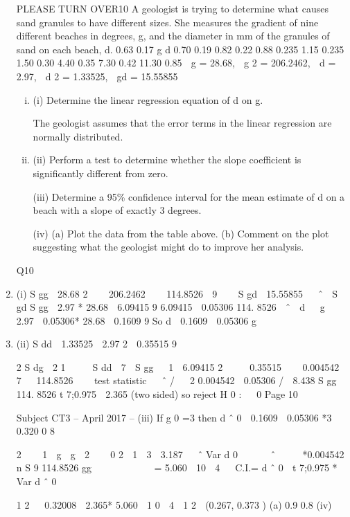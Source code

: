 \documentclass[a4paper,12pt]{article}
\begin{document}
\begin{enumerate}
PLEASE TURN OVER10
A geologist is trying to determine what causes sand granules to have different sizes.
She measures the gradient of nine different beaches in degrees, g, and the diameter in
mm of the granules of sand on each beach, d.
0.63
0.17
g
d
0.70
0.19
0.82
0.22
0.88
0.235
1.15
0.235
1.50
0.30
4.40
0.35
7.30
0.42
11.30
0.85
 g = 28.68,  g 2 = 206.2462,  d = 2.97,  d 2 = 1.33525,  gd = 15.55855
\begin{enumerate}[(i)]
\item (i)
Determine the linear regression equation of d on g.

The geologist assumes that the error terms in the linear regression are normally
distributed.
\item (ii)
Perform a test to determine whether the slope coefficient is significantly
different from zero.

(iii) Determine a 95\% confidence interval for the mean estimate of d on a beach
with a slope of exactly 3 degrees.

(iv) (a)
Plot the data from the table above.
(b)
Comment on the plot suggesting what the geologist might do to
improve her analysis.

\end{enumerate}

Q10
\item (i)
S gg

28.68 2 
  206.2462 
  114.8526

9  

S gd  15.55855 
 ˆ 
S gd
S gg

2.97 * 28.68
 6.09415
9
6.09415
 0.05306
114. 8526
 ˆ  d   g 
2.97  0.05306* 28.68
 0.1609
9
So d  0.1609  0.05306 g
\item (ii)
S dd  1.33525 
2.97 2
 0.35515
9





2
S dg
 2 1 
   S dd 
7 
S gg
  1 
6.09415 2 
   0.35515 
  0.004542
 7  
114.8526  
 
test statistic   ˆ / 
 2
0.004542
 0.05306 /
 8.438
S gg
114. 8526 
t 7;0.975  2.365 (two sided) so reject H 0 :   0
Page 10

Subject CT3  – April 2017 – %
(iii)
If g 0 =3 then d ˆ 0  0.1609  0.05306 *3  0.320 0 8

2 
  1  g  g  2  

0
2  1  3  3.187  
ˆ
Var d 0   
  ˆ   
 *0.004542
n
S
9
114.8526
gg
 
 
 
 
 
= 5.060  10  4
 
C.I.= d ˆ 0  t 7;0.975 * Var d ˆ 0

1
2

 0.32008  2.365* 5.060  1 0  4

1
2
 (0.267, 0.373 )
(a)
0.9
0.8
(iv)


\end{enumerate}
\end{document}
